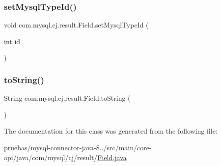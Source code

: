 \mbox{\label{classcom_1_1mysql_1_1cj_1_1result_1_1_field_afda3ae13d094f24bf0f63f0e43e8b8b8}} 
\subsubsection{\texorpdfstring{set\+Mysql\+Type\+Id()}{setMysqlTypeId()}}
{\footnotesize\ttfamily void com.\+mysql.\+cj.\+result.\+Field.\+set\+Mysql\+Type\+Id (\begin{DoxyParamCaption}\item[{int}]{id }\end{DoxyParamCaption})}

\mbox{\label{classcom_1_1mysql_1_1cj_1_1result_1_1_field_af304ee882a3173448ede28acf7b6307e}} 
\subsubsection{\texorpdfstring{to\+String()}{toString()}}
{\footnotesize\ttfamily String com.\+mysql.\+cj.\+result.\+Field.\+to\+String (\begin{DoxyParamCaption}{ }\end{DoxyParamCaption})}



The documentation for this class was generated from the following file\+:\begin{DoxyCompactItemize}
\item 
pruebas/mysql-\/connector-\/java-\/8../src/main/core-\/api/java/com/mysql/cj/result/\mbox{\hyperlink{_field_8java}{Field.\+java}}\end{DoxyCompactItemize}
